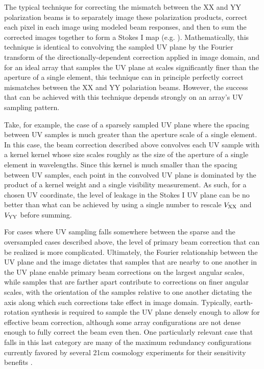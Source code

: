 \documentclass[twocolumn,apj,numberedappendix]{emulateapj}
\begin{document}
The typical technique for correcting the mismatch between the XX and YY polarization beams is to separately
image these polarization products, correct each pixel in each image using modeled beam responses,
and then to sum the corrected images together to form a Stokes I map 
(e.g. \citealt{sullivan,lofar,bernardi}).  Mathematically, this technique is identical to convolving the sampled
UV plane by the Fourier transform of the directionally-dependent correction applied in image domain, and for an ideal
array that samples the UV plane at scales significantly finer than the aperture of a single element, this technique can
in principle perfectly correct mismatches between the XX and YY polariation beams.
However, the success that can be achieved with this technique depends strongly on an array's UV sampling pattern.

Take, for example, the case of a sparsely sampled UV plane where the spacing between UV samples is much greater than
the aperture scale of a single element.  In this case, the beam correction described above 
convolves each UV sample with a kernel kernel whose size scales roughly as the size of the aperture of a
single element in wavelengths.  Since this kernel is much smaller than the spacing between UV samples, 
each point in the convolved UV plane is dominated by the product of a kernel weight and a single visibility measurement.
As such, for a chosen UV coordinate, the level of leakage in the Stokes I UV plane can
be no better than what can be achieved by using a single number to rescale ${V_{\rm XX}}$ and ${V_{\rm YY}}$ before summing.  

For cases where UV sampling falls somewhere between the sparse and the oversampled cases described above, the level
of primary beam correction that can be realized is more complicated.  Ultimately, the Fourier relationship between
the UV plane and the image dictates that samples that are nearby to one
another in the UV plane enable primary beam corrections on the largest angular scales, while samples that are farther
apart contribute to corrections on finer angular scales, with the orientation of the samples relative to one another
dictating the axis along which such corrections take effect in image domain.  Typically, earth-rotation synthesis
is required to sample the UV plane densely enough to allow for effective beam correction, although some array
configurations are not dense enough to fully correct the beam even then.  One particularly relevant case that falls
in this last category are many of the maximum redundancy configurations currently favored by several 21cm cosmology experiments
for their sensitivity benefits \citep{parsons_et_al2012a,parsons_et_al2014}.
\end{document}
